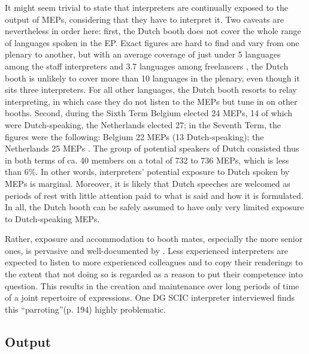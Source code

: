\documentclass[output=paper]{langscibook}
\begin{document}
It might seem trivial to state that interpreters are continually exposed to the output of MEPs, considering that they have to interpret it. Two caveats are nevertheless in order here: first, the Dutch booth does not cover the whole range of languages spoken in the EP. Exact figures are hard to find and vary from one plenary to another, but with an average coverage of just under 5 languages among the staff interpreters and 3.7 languages among freelancers \citep{Duflou2016}, the Dutch booth is unlikely to cover more than 10 languages in the plenary, even though it sits three interpreters. For all other languages, the Dutch booth resorts to relay interpreting, in which case they do not listen to the MEPs but tune in on other booths. Second, during the Sixth Term Belgium elected 24 MEPs, 14 of which were Dutch-speaking, the Netherlands elected 27; in the Seventh Term, the figures were the following: Belgium 22 MEPs (13 Dutch-speaking); the Netherlands 25 MEPs \citep{cvce_nombre_2022}. The group of potential speakers of Dutch consisted thus in both terms of ca. 40 members on a total of 732 to 736 MEPs, which is less than 6\%. In other words, interpreters’ potential exposure to Dutch spoken by MEPs is marginal. Moreover, it is likely that Dutch speeches are welcomed as periods of rest with little attention paid to what is said and how it is formulated. In all, the Dutch booth can be safely assumed to have only very limited exposure to Dutch-speaking MEPs.

Rather, exposure and accommodation to booth mates, especially the more senior ones, is pervasive and well-documented by \citet{Duflou2016}. Less experienced interpreters are expected to listen to more experienced colleagues and to copy their renderings to the extent that not doing so is regarded as a reason to put their competence into question. This results in the creation and maintenance over long periods of time of a joint repertoire of expressions. One DG SCIC interpreter \citet{Duflou2016} interviewed finds this “parroting”(p. 194) highly problematic. 

\subsection{Output}\label{sec:defrancq:4.3}
\end{document}
